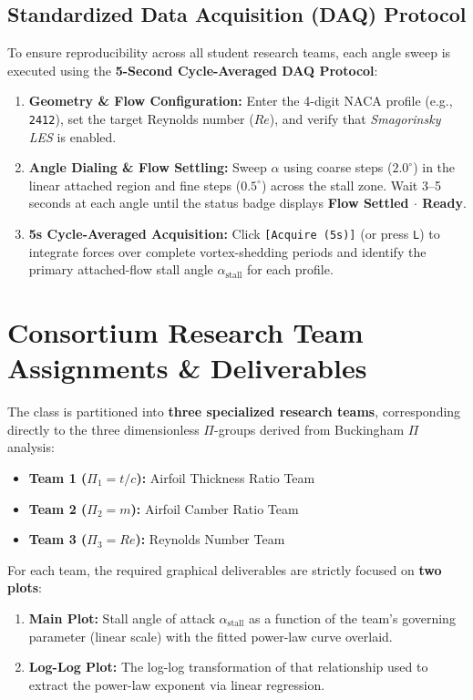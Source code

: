 \documentclass[11pt,a4paper]{article}
\begin{document}
\subsection{Standardized Data Acquisition (DAQ) Protocol}
To ensure reproducibility across all student research teams, each angle sweep is executed using the \textbf{5-Second Cycle-Averaged DAQ Protocol}:
\begin{enumerate}[itemsep=2pt]
    \item \textbf{Geometry \& Flow Configuration:} Enter the 4-digit NACA profile (e.g., \texttt{2412}), set the target Reynolds number ($Re$), and verify that \textit{Smagorinsky LES} is enabled.
    \item \textbf{Angle Dialing \& Flow Settling:} Sweep $\alpha$ using coarse steps ($2.0^\circ$) in the linear attached region and fine steps ($0.5^\circ$) across the stall zone. Wait 3--5 seconds at each angle until the status badge displays \textbf{\textcolor{green!70!black}{Flow Settled $\cdot$ Ready}}.
    \item \textbf{5s Cycle-Averaged Acquisition:} Click \texttt{[Acquire (5s)]} (or press \texttt{L}) to integrate forces over complete vortex-shedding periods and identify the primary attached-flow stall angle $\alpha_{\text{stall}}$ for each profile.
\end{enumerate}

\section{Consortium Research Team Assignments \& Deliverables}

The class is partitioned into \textbf{three specialized research teams}, corresponding directly to the three dimensionless $\Pi$-groups derived from Buckingham $\Pi$ analysis:
\begin{itemize}[leftmargin=*, itemsep=2pt]
    \item \textbf{Team 1 ($\Pi_1 = t/c$):} Airfoil Thickness Ratio Team
    \item \textbf{Team 2 ($\Pi_2 = m$):} Airfoil Camber Ratio Team
    \item \textbf{Team 3 ($\Pi_3 = Re$):} Reynolds Number Team
\end{itemize}
For each team, the required graphical deliverables are strictly focused on \textbf{two plots}:
\begin{enumerate}[leftmargin=*, itemsep=2pt]
    \item \textbf{Main Plot:} Stall angle of attack $\alpha_{\text{stall}}$ as a function of the team's governing parameter (linear scale) with the fitted power-law curve overlaid.
    \item \textbf{Log-Log Plot:} The log-log transformation of that relationship used to extract the power-law exponent via linear regression.
\end{enumerate}
\end{document}
